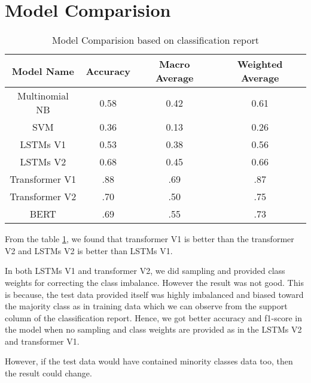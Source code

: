 \section{Model Comparision}
\begin{table}[H]
    \begin{center}
        \begin{tabular}{ |c|c|c|c| }
            \hline
            Model Name               & Accuracy & Macro Average & Weighted Average \\
            \hline
            Multinomial NB & 0.58 & 0.42 & 0.61\\
            \hline
            SVM            & 0.36       & 0.13 & 0.26\\
            \hline
            LSTMs V1    & 0.53      & 0.38 & 0.56\\
            \hline
            LSTMs V2    & 0.68  & 0.45 & 0.66\\
            \hline
            Transformer V1     & .88  & .69 & .87 \\
            \hline
            Transformer V2   &   .70   & .50 & .75 \\
            \hline
            BERT  &   .69   & .55 & .73 \\
            \hline
        \end{tabular}
    \end{center}
    \caption{Model Comparision based on classification report}
    \label{table:Model Comparision based on classification report}
\end{table}

From the table \ref{table:Model Comparision based on classification report}, we found that transformer V1 is better than the transformer V2 and LSTMs V2 is better than LSTMs V1.

In both LSTMs V1 and transformer V2, we did sampling and provided class weights for correcting the class imbalance. However the result was not good. This is because, the test data provided itself was highly imbalanced and biased toward the majority class as in training data which we can observe from the support column of the classification report. Hence, we got better accuracy and f1-score in the model when no sampling and class weights are provided as in the LSTMs V2 and transformer V1. 

However, if the test data would have contained minority classes data too, then the result could change. 

